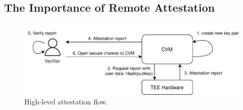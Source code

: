 \subsection{The Importance of Remote Attestation}

\begin{figure}[t]
  \centering
    \includegraphics[width=.99\columnwidth]{figures/attestation-flow.drawio.pdf}
  \caption{High-level attestation flow.}
  \label{fig:attestation-flow}
\end{figure}

